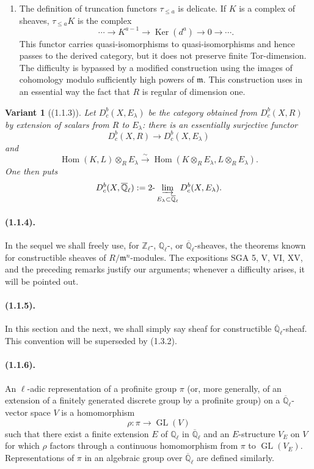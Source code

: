\documentclass[11pt]{article}
\newtheorem{variant}{Variant}
\theoremstyle{remark}
\newcommand{\Ql}{\mathbb{Q}_\ell}
\newcommand{\Qlb}{\overline{\mathbb{Q}}_\ell}
\newcommand{\Zl}{\mathbb{Z}_\ell}
\newcommand{\Hom}{\operatorname{Hom}}
\newcommand{\GL}{\operatorname{GL}}
\newcommand{\Ker}{\operatorname{Ker}}
\newcommand{\limind}{\varinjlim}
\begin{document}
\begin{enumerate}[label=\alph*)]
\item The definition of truncation functors $\tau_{\le a}$ is delicate. If $K$ is a complex of sheaves, $\tau_{\le a}K$ is the complex
\[
\cdots\to K^{a-1}\to \Ker(d^a)\to 0\to\cdots.
\]
This functor carries quasi-isomorphisms to quasi-isomorphisms and hence passes to the derived category, but it does not preserve finite Tor-dimension. The difficulty is bypassed by a modified construction using the images of cohomology modulo sufficiently high powers of $\mathfrak m$. This construction uses in an essential way the fact that $R$ is regular of dimension one.
\end{enumerate}

\begin{variant}[(1.1.3)]
Let $D^b_c(X,E_\lambda)$ be the category obtained from $D^b_c(X,R)$ by extension of scalars from $R$ to $E_\lambda$: there is an essentially surjective functor
\[
D^b_c(X,R)\longrightarrow D^b_c(X,E_\lambda)
\]
and
\[
\Hom(K,L)\otimes_R E_\lambda\xrightarrow{\sim}
\Hom(K\otimes_R E_\lambda,L\otimes_R E_\lambda).
\]
One then puts
\[
D^b_c(X,\Qlb):=2\text{-}\limind_{E_\lambda\subset\Qlb} D^b_c(X,E_\lambda).
\]
\end{variant}

\paragraph{(1.1.4).} In the sequel we shall freely use, for $\Zl$-, $\Ql$-, or $\Qlb$-sheaves, the theorems known for constructible sheaves of $R/\mathfrak m^n$-modules. The expositions SGA 5, V, VI, XV, and the preceding remarks justify our arguments; whenever a difficulty arises, it will be pointed out.

\paragraph{(1.1.5).} In this section and the next, we shall simply say sheaf for constructible $\Qlb$-sheaf. This convention will be superseded by (1.3.2).

\paragraph{(1.1.6).} An $\ell$-adic representation of a profinite group $\pi$ (or, more generally, of an extension of a finitely generated discrete group by a profinite group) on a $\Qlb$-vector space $V$ is a homomorphism
\[
\rho:\pi\to \GL(V)
\]
such that there exist a finite extension $E$ of $\Ql$ in $\Qlb$ and an $E$-structure $V_E$ on $V$ for which $\rho$ factors through a continuous homomorphism from $\pi$ to $\GL(V_E)$. Representations of $\pi$ in an algebraic group over $\Qlb$ are defined similarly.
\end{document}
